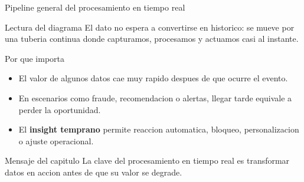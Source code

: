 \documentclass[aspectratio=169]{beamer}
\begin{document}
\begin{frame}{Pipeline general del procesamiento en tiempo real}
  \centering
  \vspace{0.3cm}

  \begin{block}{Lectura del diagrama}
    El dato no espera a convertirse en historico: se mueve por una tuberia continua donde capturamos, procesamos y actuamos casi al instante.
  \end{block}
\end{frame}

\begin{frame}{Por que importa}
  \begin{itemize}
    \item El valor de algunos datos cae muy rapido despues de que ocurre el evento.
    \item En escenarios como fraude, recomendacion o alertas, llegar tarde equivale a perder la oportunidad.
    \item El \textbf{insight temprano} permite reaccion automatica, bloqueo, personalizacion o ajuste operacional.
  \end{itemize}
  \vspace{0.25cm}
  \begin{block}{Mensaje del capitulo}
    La clave del procesamiento en tiempo real es transformar datos en accion antes de que su valor se degrade.
  \end{block}
\end{frame}
\end{document}
